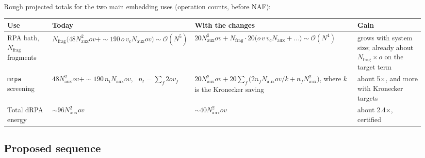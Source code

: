 \documentclass[11pt,a4paper]{article}
\newcommand{\code}[1]{\texttt{\small #1}}
\newcommand{\Naux}{N_{\mathrm{aux}}}
\newcommand{\nt}{n_{t}}
\newcommand{\Nfrag}{N_{\mathrm{frag}}}
\newcommand{\ov}{ov}
\begin{document}
\noindent Rough projected totals for the two main embedding uses (operation counts, before NAF):

\begin{center}
\small
\begin{tabularx}{\textwidth}{@{}>{\raggedright\arraybackslash}p{2.4cm}LL>{\raggedright\arraybackslash}p{3.0cm}@{}}
\toprule
Use & Today & With the changes & Gain \\
\midrule
RPA bath, $\Nfrag$ fragments
  & $\Nfrag\big(48\Naux^2\ov + {\sim}190\,o\,v_c\Naux\ov\big)\sim\mathcal{O}(N^5)$
  & $20\Naux^2\ov + \Nfrag\cdot20\big(o\,v\,v_c\Naux + \dots\big)\sim\mathcal{O}(N^4)$
  & grows with system size; already about $\Nfrag\times o$ on the target term \\
\code{mrpa} screening
  & $48\Naux^2\ov + {\sim}190\,\nt\Naux\ov$, \ $\nt=\sum_f2\ov_f$
  & $20\Naux^2\ov + 20\sum_f\big(2n_f\Naux\ov/k + n_f\Naux^2\big)$, where $k$ is the Kronecker saving
  & about 5$\times$, and more with Kronecker targets \\
Total dRPA energy & ${\sim}96\Naux^2\ov$ & ${\sim}40\Naux^2\ov$ & about 2.4$\times$, certified \\
\bottomrule
\end{tabularx}
\end{center}

\subsection{Proposed sequence}
\end{document}
